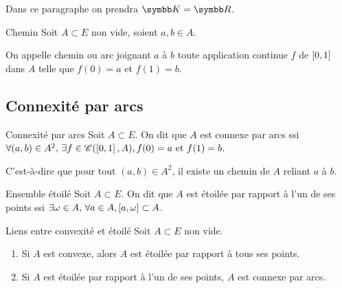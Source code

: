Dans ce paragraphe on prendra $\K = \R$.

\begin{definition}{Chemin}{}
    Soit $A \subset E$ non vide, soient $a, b \in A$. 

    On appelle chemin ou arc joignant $a$ à $b$ toute application continue $f$ de 
    $\left[0, 1\right]$ dans $A$ telle que $f(0) = a$ et $f(1) = b$.
\end{definition}

\subsection{Connexité par arcs}

\begin{definition}{Connexité par arcs}{}
    Soit $A \subset E$. 
    On dit que $A$ est connexe par arcs ssi $\forall (a, b) \in A^2, \, \exists f \in \mathscr C(\left[0, 1\right], A), f(0) = a \text{ et } f(1) = b$. 

    C'est-à-dire que pour tout $(a, b) \in A^2$, il existe un chemin de $A$ reliant $a$ à $b$.
\end{definition}

\begin{definition}{Ensemble étoilé}{}
    Soit $A \subset E$.
    On dit que $A$ est étoilée par rapport à l'un de ses points ssi $\exists \omega \in A, 
    \, \forall a \in A, \left[a, \omega\right] \subset A$.
\end{definition}

\begin{proposition}{Liens entre convexité et étoilé}{}
    Soit $A \subset E$ non vide. 
    \begin{enumerate}
        \item Si $A$ est convexe, alors $A$ est étoilée par rapport à tous ses points. 
        \item Si $A$ est étoilée par rapport à l'un de ses points, $A$ est connexe par arcs. 
    \end{enumerate}
\end{proposition}


